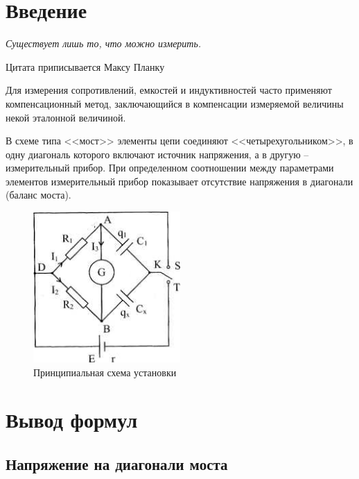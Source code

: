 \documentclass[a4paper,12pt]{extarticle}
\def\source{templates}
\begin{document}

\tableofcontents
\newpage

\section*{Введение} %
\label{sec:input}
\epigraph{\textit{Существует лишь то, что можно измерить.}}
{Цитата приписывается Максу Планку}


 Для измерения сопротивлений, емкостей и индуктивностей  часто  применяют
компенсационный метод, заключающийся в компенсации измеряемой величины некой эталонной величиной. 

В схеме типа <<мост>> элементы цепи соединяют  <<четырехугольником>>, в одну диагональ  которого  включают  источник  напряжения,  а  в  другую  --
измерительный  прибор.  При  определенном  соотношении   между   параметрами
элементов измерительный прибор показывает отсутствие напряжения в  диагонали
(баланс моста).



\begin{figure}[H]
	\centering
	\includegraphics[width=0.5\textwidth]{img/chem}
	\caption{Принципиальная схема установки}
	\label{fig:figure1}
\end{figure}

\newpage
\section{Вывод формул}
\subsection{Напряжение на диагонали моста}
\end{document}
